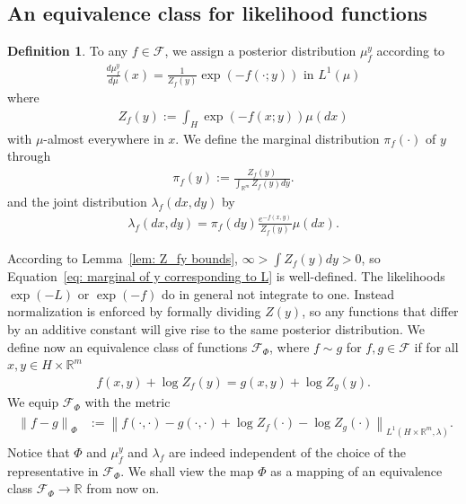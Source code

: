 \documentclass{amsart}
\theoremstyle{definition}
\newtheorem{definition}[theorem]{Definition}
\newcommand{\R}{{\mathbb R}}
\newcommand{\norm}[1]{\left\|#1\right\|}
\newcommand{\F}{\mathcal{F}}
\begin{document}
\subsection{An equivalence class for likelihood functions}
\begin{definition}\label{def: approximate posterior}
    To any $f \in \F$, we assign a posterior distribution $\mu^y_f$ according to
\begin{eqnarray*}
    \frac{d \mu^y_f}{d \mu}(x) = \frac{1}{Z_f(y)} \exp \left( -f(\cdot; y) \right) \text{ in } L^1(\mu)
\end{eqnarray*}
 where
\begin{eqnarray}\label{eq:normalization}
        Z_f(y) := \int_H \exp \left( -f(x; y) \right) \mu(dx)
\end{eqnarray}
with $\mu$-almost everywhere in $x$.
We define the marginal distribution $\pi_f(\cdot)$ of $y$ through
 \begin{eqnarray}\label{eq: marginal of y corresponding to L}
     \pi_f(y) := \frac{Z_f(y)}{\int_{\R^m} Z_f(y) dy}.
 \end{eqnarray}
 and the joint distribution $\lambda_f(dx, dy)$ by
 \begin{eqnarray}\label{eq: joint}
     \lambda_f(dx, dy) = \pi_f(dy)\frac{e^{-f(x, y)}}{Z_f(y)}\mu(dx).
 \end{eqnarray}
\end{definition}
According to Lemma~\ref{lem: Z_fy bounds}, $\infty > \int Z_f(y) dy > 0$, so Equation~\eqref{eq: marginal of y corresponding to L} is well-defined.
The likelihoods $\exp(-L)$ or $\exp(-f)$ do in general not integrate to one. Instead normalization is enforced by formally dividing $Z(y)$, so any functions that differ by an additive constant will give rise to the same posterior distribution.
We define now an equivalence class of functions $\F_\Phi$, where $f \sim g$ for $f, g \in \F$ if for all $x, y \in H\times \R^m$
\begin{eqnarray*}
   f(x, y) + \log Z_f(y) = g(x, y) + \log Z_g(y).
\end{eqnarray*}
We equip $\F_\Phi$ with the metric
\begin{eqnarray}
\begin{aligned}\label{eq: norm for equivalence}
        \norm{f -g }_\Phi &:= \norm{f(\cdot, \cdot) -g(\cdot, \cdot)  + \log Z_f(\cdot)  - \log Z_g(\cdot) }_{L^1(H \times \R^m, \lambda)}.
\end{aligned}
\end{eqnarray}
Notice that $\Phi$ and $\mu^y_f$ and $\lambda_f$ are indeed independent of the choice of the representative in $\F_\Phi$. We shall view the map $\Phi$ as a mapping of an equivalence class $\F_\Phi \rightarrow \R$ from now on.
\end{document}
